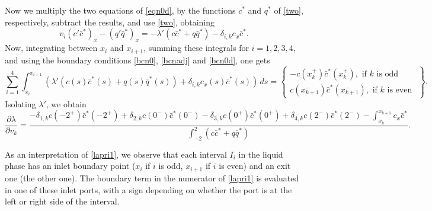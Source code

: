 \documentclass[a4paper]{article}
\numberwithin{equation}{section}
\begin{document}
Now we multiply the two equations of \eqref{eqn0d}, by the functions $\overline{c^*}$ and $\overline{q^*}$ of \eqref{two}, respectively, subtract the results, and use \eqref{two}, obtaining
\begin{equation*}%
v_i(c'\bar{c}^*)_x-(q'\bar{q}^*)_x=-\lambda'(c\bar{c}^*+q\bar{q}^*)-\delta_{i,k}c_x\bar{c}^*.
\end{equation*}
Now, integrating between $x_i$ and $x_{i+1}$, summing these integrals for $i=1,2,3,4$, and using the boundary conditions \eqref{bcn0}, \eqref{bcnadj} and \eqref{bcn0d}, one gets
$$
\sum_{i=1}^4 \int_{x_{i}}^{x_{i+1}}\left(\lambda'(c(s)\bar{c}^*(s)+q(s)\bar{q}^*(s))+\delta_{i,k}c_x(s)\bar{c}^*(s)\right)\, ds=
\left\{\begin{matrix}
-c(x_k^+)\bar{c}^*(x_k^+), \text{ if } k \text{ is odd}\\
c(x_{k+1}^-)\bar{c}^*(x_{k+1}^-), \text{ if } k \text{ is even }
\end{matrix}
\right\}.
$$
Isolating $\lambda'$, we obtain
\begin{equation}\label{lapri1}
\dfrac{\partial\lambda}{\partial v_k}=
\dfrac{-\delta_{1,k}c(-2^+)\bar{c}^*(-2^+)+\delta_{2,k}c(0^-)\bar{c}^*(0^-)-\delta_{3,k}c(0^+)\bar{c}^*(0^+)+\delta_{4,k}c(2^-)\bar{c}^*(2^-)- \int_{x_k}^{x_{k+1}}c_x\bar{c}^*}
{\int_{-2}^2(c\bar{c}^*+q\bar{q}^*)}.
\end{equation}

As an interpretation of \eqref{lapri1}, we observe that each interval $I_i$ in the liquid phase has an inlet boundary point ($x_i$ if $i$ is odd, $x_{i+1}$ if $i$ is even) and an exit one (the other one). The boundary term in the numerator of \eqref{lapri1} is evaluated in one of these inlet ports, with a sign depending on whether the port is at the left or right side of the interval.
\end{document}
